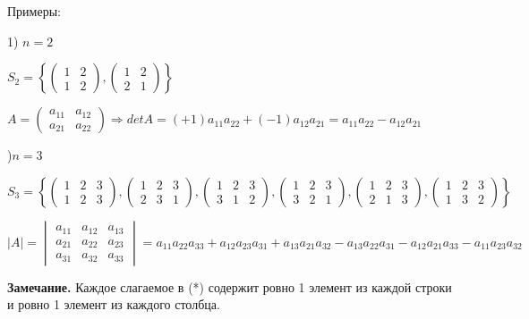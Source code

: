 \bigskip
Примеры: 

1) $n = 2$ 

$S_2 = \left\{ \begin{pmatrix} 1 & 2 \\ 1 & 2 \end{pmatrix}, \begin{pmatrix} 1 & 2 \\ 2 & 1 \end{pmatrix} \right\}$

$A = \begin{pmatrix} a_{11} & a_{12} \\ a_{21} & a_{22} \end{pmatrix} \Rightarrow detA = (+1) a_{11} a_{22} + (-1) a_{12} a_{21} = a_{11} a_{22} - a_{12} a_{21}$

)$n = 3$

$S_3 = \left\{ 
\begin{pmatrix} 1 & 2 & 3 \\ 1 & 2 & 3 \end{pmatrix}, 
\begin{pmatrix} 1 & 2 & 3 \\ 2 & 3 & 1 \end{pmatrix}, 
\begin{pmatrix} 1 & 2 & 3 \\ 3 & 1 & 2 \end{pmatrix}, 
\begin{pmatrix} 1 & 2 & 3 \\ 3 & 2 & 1 \end{pmatrix}, 
\begin{pmatrix} 1 & 2 & 3 \\ 2 & 1 & 3 \end{pmatrix}, 
\begin{pmatrix} 1 & 2 & 3 \\ 1 & 3 & 2 \end{pmatrix} \right\}$

$|A| = \begin{vmatrix} a_{11} & a_{12} & a_{13} \\ a_{21} & a_{22} & a_{23} \\ a_{31} & a_{32} & a_{33} \end{vmatrix} = a_{11} a_{22} a_{33} + a_{12} a_{23} a_{31} + a_{13} a_{21} a_{32} - a_{13} a_{22} a_{31} - a_{12} a_{21} a_{33} - a_{11} a_{23} a_{32} $

\bigskip
\textbf{Замечание.} Каждое слагаемое в (*) содержит ровно 1 элемент из каждой строки и ровно 1 элемент из каждого столбца.

